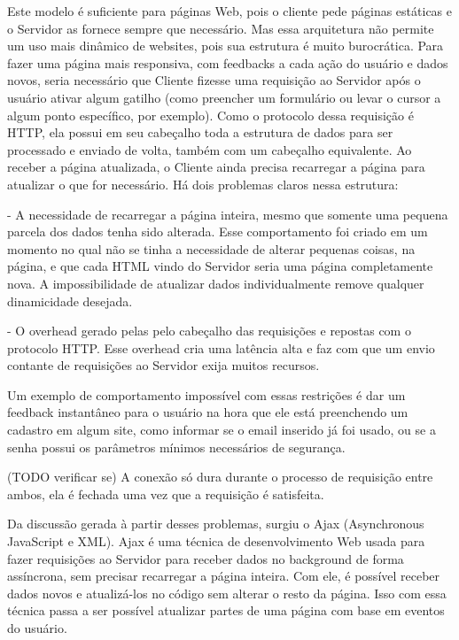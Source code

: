\documentclass[a4paper,12pt]{article}
\begin{document}
Este modelo é suficiente para páginas Web, pois o cliente pede páginas estáticas e o Servidor as fornece sempre que necessário. Mas essa arquitetura não permite um uso mais dinâmico de websites, pois sua estrutura é muito burocrática. Para fazer uma página mais responsiva, com feedbacks a cada ação do usuário e dados novos, seria necessário que Cliente fizesse uma requisição ao Servidor após o usuário ativar algum gatilho (como preencher um formulário ou levar o cursor a algum ponto específico, por exemplo). Como o protocolo dessa requisição é HTTP, ela possui em seu cabeçalho toda a estrutura de dados para ser processado e enviado de volta, também com um cabeçalho equivalente. Ao receber a página atualizada, o Cliente ainda precisa recarregar a página para atualizar o que for necessário. Há dois problemas claros nessa estrutura:

- A necessidade de recarregar a página inteira, mesmo que somente uma pequena parcela dos dados tenha sido alterada. Esse comportamento foi criado em um momento no qual não se tinha a necessidade de alterar pequenas coisas, na página, e que cada HTML vindo do Servidor seria uma página completamente nova. A impossibilidade de atualizar dados individualmente remove qualquer dinamicidade desejada.

- O overhead gerado pelas pelo cabeçalho das requisições e repostas com o protocolo HTTP. Esse overhead cria uma latência alta e faz com que um envio contante de requisições ao Servidor exija muitos recursos.

Um exemplo de comportamento impossível com essas restrições é dar um feedback instantâneo para o usuário na hora que ele está preenchendo um cadastro em algum site, como informar se o email inserido já foi usado, ou se a senha possui os parâmetros mínimos necessários de segurança.

(TODO verificar se) A conexão só dura durante o processo de requisição entre ambos, ela é fechada uma vez que a requisição é satisfeita.

Da discussão gerada à partir desses problemas, surgiu o Ajax (Asynchronous JavaScript e XML). Ajax é uma técnica de desenvolvimento Web usada para fazer requisições ao Servidor para receber dados no background de forma assíncrona, sem precisar recarregar a página inteira. Com ele, é possível receber dados novos e atualizá-los no código sem alterar o resto da página. Isso com essa técnica passa a ser possível atualizar partes de uma página com base em eventos do usuário.
\end{document}

